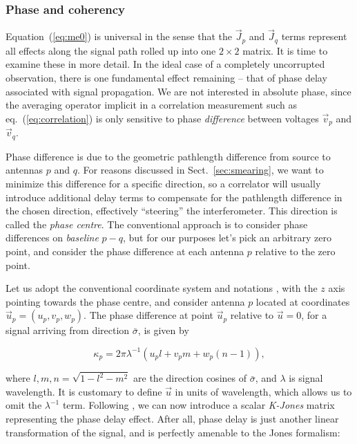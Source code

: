 \documentclass[]{aa}
\begin{document}
\subsubsection{\label{sec:coherency}Phase and coherency}

Equation~(\ref{eq:me0}) is universal in the sense that the $\vec J_p$ and $\vec J_q$ terms represent all effects along the signal path rolled up into one $2\times2$ matrix. It is time to examine these in more detail. In the ideal case of a completely uncorrupted observation, there is one fundamental effect remaining -- that of phase delay associated with signal propagation. We are not interested in absolute phase, since the averaging operator implicit in a correlation measurement such as eq.~(\ref{eq:correlation}) is only sensitive to phase {\em difference} between voltages $\vec v_p$ and $\vec v_q$. 

Phase difference is due to the geometric pathlength difference from source to antennas $p$ and $q$. For reasons discussed in Sect.~\ref{sec:smearing}, we want to minimize this difference for a specific direction, so a correlator will usually introduce additional delay terms to compensate for the pathlength difference in the chosen direction, effectively ``steering'' the interferometer. This direction is called the {\em phase centre}. The conventional approach is to consider phase differences on {\em baseline} $p-q$, but for our purposes let's pick an arbitrary zero point, and consider the phase difference at each antenna $p$ relative to the zero point.

Let us adopt the conventional coordinate system and notations \citep[see e.g.][]{tms}, with the $z$ axis pointing towards the phase centre, and consider antenna $p$ located at coordinates $\vec u_p=(u_p,v_p,w_p)$. The phase difference at point $\vec u_p$ relative to $\vec u=0$, for a signal arriving from direction $\bar \sigma$, is given by

  \[
  \kappa_p = 2\pi\lambda^{-1}(u_p l+v_p m+w_p (n-1)),
  \]

where $l,m,n=\sqrt{1-l^2-m^2}$ are the direction cosines of $\bar\sigma$, and $\lambda$ is signal wavelength. It is customary to define $\vec u$ in units of wavelength, which allows us to omit the $\lambda^{-1}$ term.
Following \citet{JEN:note185}, we can now introduce a scalar {\em K-Jones} matrix representing the phase delay effect. After all, phase delay is just another linear transformation of the signal, and is perfectly amenable to the Jones formalism:
\end{document}
